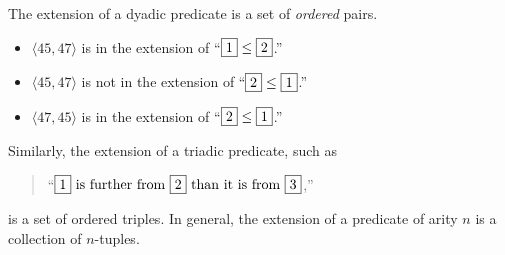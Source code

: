 The extension of a dyadic predicate is a set of \emph{ordered} pairs.
\begin{itemize}
\item
$\langle 45,47 \rangle$ is in the extension of ``$\fbox{1} \leq \fbox{2}$.''
\item
$\langle 45,47 \rangle$ is not in the extension of ``$\fbox{2} \leq \fbox{1}$.''
\item
$\langle 47,45 \rangle$ is in the extension of ``$\fbox{2} \leq \fbox{1}$.''
\end{itemize}

Similarly, the extension of a triadic predicate, such as 
\begin{quote}
``$\fbox{1}\ \mathrm{is\
further\ from}\ \fbox{2}\ \mathrm{than\ it\ is\ from}\ \fbox{3}$,'' 
\end{quote}
is a set of
ordered triples. In general, the extension of a predicate of arity $n$ is a collection of $n$-tuples. 
\iffalse
Evidently, this idea generalizes to all dimensions $1 \leq n$; not only just the $2$-variable ordered paris and the $3$-variable ordered triplets. In general, an $n$-ary predicate on a universe $U$ is any subset of the \emph{Cartesian Product} $U^n$, ie the set of tuples of length $n$ whose components are in $U$. 

For simplicity's sake, we will normally confine ourselves to the binary and ternary cases in examples and exposition. 
\fi